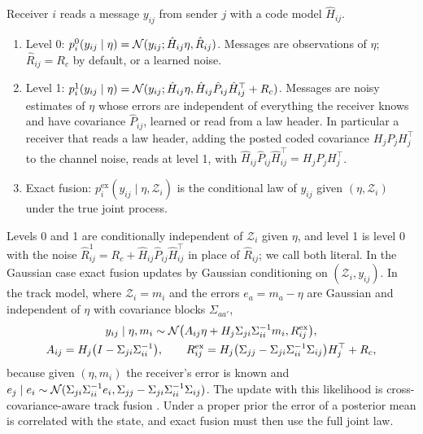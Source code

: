 \begin{definition}\label{def:fw-levels}
Receiver $i$ reads a message $y_{ij}$ from sender $j$ with a code model $\hat H_{ij}$.
\begin{enumerate}
\item[] Level 0: $p^0_i(y_{ij}\mid\eta)=\mathcal{N}(y_{ij};\hat H_{ij}\eta,\hat R_{ij})$. Messages are observations of $\eta$; $\hat R_{ij}=R_c$ by default, or a learned noise.
\item[] Level 1: $p^1_i(y_{ij}\mid\eta)=\mathcal{N}(y_{ij};\hat H_{ij}\eta,\hat H_{ij}\hat P_{ij}\hat H_{ij}^\top+R_c)$. Messages are noisy estimates of $\eta$ whose errors are independent of everything the receiver knows and have covariance $\hat P_{ij}$, learned or read from a law header. In particular a receiver that reads a law header, adding the posted coded covariance $H_jP_jH_j^\top$ to the channel noise, reads at level 1, with $\hat H_{ij}\hat P_{ij}\hat H_{ij}^\top=H_jP_jH_j^\top$.
\item[] Exact fusion: $p^{\mathrm{ex}}_i(y_{ij}\mid\eta,\mathcal Z_i)$ is the conditional law of $y_{ij}$ given $(\eta,\mathcal Z_i)$ under the true joint process.
\end{enumerate}
\end{definition}

Levels 0 and 1 are conditionally independent of $\mathcal Z_i$ given $\eta$, and level 1 is level 0 with the noise $\hat R^1_{ij}=R_c+\hat H_{ij}\hat P_{ij}\hat H_{ij}^\top$ in place of $\hat R_{ij}$; we call both literal. In the Gaussian case exact fusion updates by Gaussian conditioning on $(\mathcal Z_i,y_{ij})$. In the track model, where $\mathcal Z_i=m_i$ and the errors $e_a=m_a-\eta$ are Gaussian and independent of $\eta$ with covariance blocks $\Sigma_{aa'}$,
\begin{equation}\label{eq:fw-track}
\begin{gathered}
y_{ij}\mid\eta,m_i\sim\mathcal{N}\bigl(A_{ij}\eta+H_j\Sigma_{ji}\Sigma_{ii}^{-1}m_i,R^{\mathrm{ex}}_{ij}\bigr),\\
A_{ij}=H_j\bigl(I-\Sigma_{ji}\Sigma_{ii}^{-1}\bigr),\qquad R^{\mathrm{ex}}_{ij}=H_j\bigl(\Sigma_{jj}-\Sigma_{ji}\Sigma_{ii}^{-1}\Sigma_{ij}\bigr)H_j^\top+R_c,
\end{gathered}
\end{equation}
because given $(\eta,m_i)$ the receiver's error is known and $e_j\mid e_i\sim\mathcal{N}(\Sigma_{ji}\Sigma_{ii}^{-1}e_i,\Sigma_{jj}-\Sigma_{ji}\Sigma_{ii}^{-1}\Sigma_{ij})$. The update with this likelihood is cross-covariance-aware track fusion \citep{barshalom1986effect}. Under a proper prior the error of a posterior mean is correlated with the state, and exact fusion must then use the full joint law.

